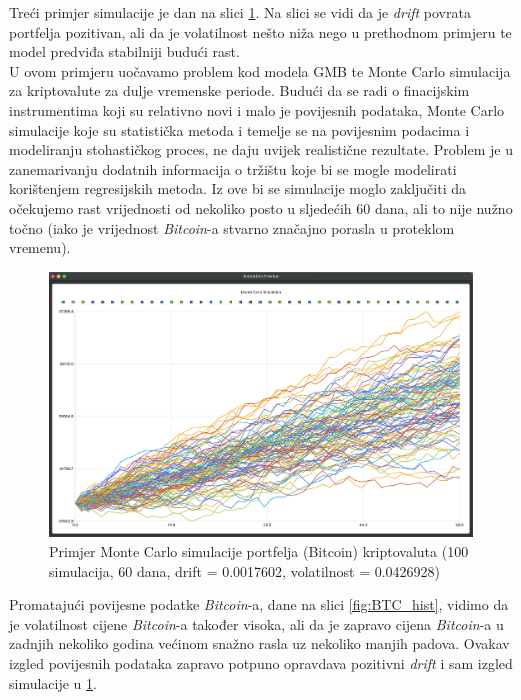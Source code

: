 \documentclass[zavrsnirad, upload]{fer}
\begin{document}
Treći primjer simulacije je dan na slici \ref{fig:monte_carlo_example3}.
Na slici se vidi da je \textit{drift} povrata portfelja pozitivan,
ali da je volatilnost nešto niža nego u prethodnom primjeru te model
predviđa stabilniji budući rast.\\
U ovom primjeru uočavamo problem kod modela GMB te Monte Carlo simulacija za
kriptovalute za dulje vremenske periode.
Budući da se radi o finacijskim instrumentima koji su
relativno novi i malo je povijesnih podataka,
Monte Carlo simulacije koje su statistička metoda i temelje se
na povijesnim podacima i modeliranju stohastičkog proces,
ne daju uvijek
realistične rezultate. Problem je u zanemarivanju dodatnih
informacija o tržištu koje bi se mogle modelirati korištenjem
regresijskih metoda.
Iz ove bi se simulacije moglo zaključiti da očekujemo rast vrijednosti
od nekoliko posto u sljedećih 60 dana, ali to nije nužno točno
(iako je vrijednost \textit{Bitcoin}-a stvarno značajno porasla u proteklom vremenu).
\begin{figure}[H]
    \centering
    \includegraphics[width=1.0\textwidth]{Figures/monte_carlo_example3.png}
    \caption{Primjer Monte Carlo simulacije portfelja (Bitcoin) kriptovaluta (100
    simulacija, 60 dana, drift = 0.0017602, volatilnost = 0.0426928)}
    \label{fig:monte_carlo_example3}
\end{figure}
Promatajući povijesne podatke \textit{Bitcoin}-a, dane na slici \ref{fig:BTC_hist},
vidimo da je volatilnost cijene \textit{Bitcoin}-a također visoka, ali da je
zapravo cijena \textit{Bitcoin}-a u zadnjih nekoliko godina većinom snažno
rasla uz nekoliko manjih padova. Ovakav izgled povijesnih podataka
zapravo potpuno opravdava pozitivni \textit{drift} i sam izgled
simulacije u \ref{fig:monte_carlo_example3}.
\end{document}
